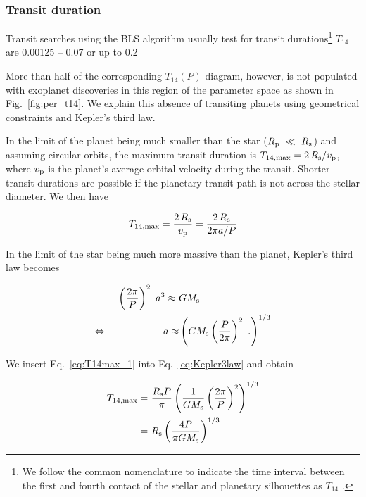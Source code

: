 \documentclass[twocolumn,tighten,longauthor]{myaastex62}
\begin{document}
\subsubsection{Transit duration}
Transit searches using the BLS algorithm usually test for transit durations\footnote{We follow the common nomenclature to indicate the time interval between the first and fourth contact of the stellar and planetary silhouettes as $T_{14}$ \citep{2003ApJ...585.1038S}.} $T_{14}$ are 0.00125 -- 0.07 \citep{2013ApJ...770...69P} or up to 0.2 \citep{2014ApJ...787...47S}


More than half of the corresponding $T_{14}(P)$ diagram, however, is not populated with exoplanet discoveries in this region of the parameter space as shown in Fig.~\ref{fig:per_t14}. We explain this absence of transiting planets using geometrical constraints and Kepler's third law.

In the limit of the planet being much smaller than the star ($R_{\rm p}~\ll~R_{\rm s}$) and assuming circular orbits, the maximum transit duration is $T_{14,{\rm max}}=2\,R_{\rm s}/v_{\rm p}$, where $v_{\rm p}$ is the planet's average orbital velocity during the transit. Shorter transit durations are possible if the planetary transit path is not across the stellar diameter. We then have

\begin{equation}\label{eq:T14max_1}
T_{14,{\rm max}} = \frac{2\,R_{\rm s}}{v_{\rm p}} = \frac{2\,R_{\rm s}}{2\pi a / P}
\end{equation}

In the limit of the star being much more massive than the planet, Kepler's third law becomes

\begin{align}\label{eq:Kepler3law}\nonumber
\left(\frac{2\pi}{P}\right)^2 \ a^3 \approx \ & G M_{\rm s} \\
\Leftrightarrow \hspace{2cm} a \approx & \left( G M_{\rm s} \left( \frac{P}{2\pi} \right)^2  \ .\right)^{1/3}
\end{align}

We insert Eq.~\eqref{eq:T14max_1} into Eq.~\eqref{eq:Kepler3law} and obtain

\begin{align} \label{eq:T14max_2}\nonumber
T_{14,{\rm max}} = \ & \frac{R_{\rm s} P}{\pi} \left( \frac{1}{G M_{\rm s}} \left( \frac{2\pi}{P} \right)^2  \right)^{1/3} \\
= \ & R_{\rm s} \left( \frac{4P}{\pi G M_{\rm s}} \right)^{1/3}
\end{align}
\end{document}
